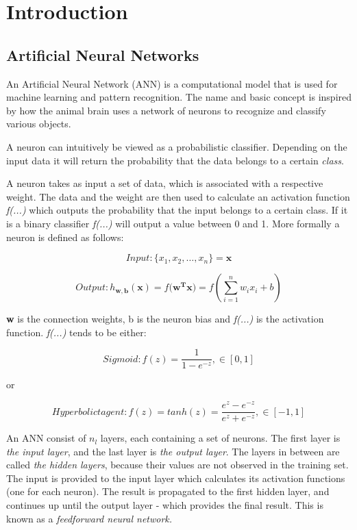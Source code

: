\chapter{Introduction}

\section{Artificial Neural Networks}

An Artificial Neural Network (ANN) is a computational model that is used for machine learning and pattern recognition. The name and basic concept is inspired by how the animal brain uses a network of neurons to recognize and classify various objects. 

A neuron can intuitively be viewed as a probabilistic classifier. Depending on the input data it will return the probability that the data belongs to a certain \textit{class}. 

A neuron takes as input a set of data, which is associated with a respective weight. The data and the weight are then used to calculate an activation function \textit{f(...)} which outputs the probability that the input belongs to a certain class. If it is a binary classifier \textit{f(...)} will output a value between 0 and 1. More formally a neuron is defined as follows: 

\begin{equation*}
Input: \{x_1, x_2,\dots, x_n\} = \mathbf{x} 
\end{equation*}

\begin{equation*}
Output: h_{\mathbf{w, b}}(\mathbf{x}) = f(\mathbf{w^{T}x)} = f(\sum_{i=1}^{n}w_i x_i + b)
\end{equation*}

\textbf{w} is the connection weights, b is the neuron bias and \textit{f(...)} is the activation function. \textit{f(...)} tends to be either:

\begin{equation*}
Sigmoid: f(z) = \frac{1}{1 - e^{-z}}, \in [0,1]
\end{equation*}

or 

\begin{equation*}
Hyperbolic tagent: f(z) = tanh(z) = \frac{e^z - e^{-z}}{e^z + e^{-z}}, \in [-1,1]
\end{equation*}

An ANN consist of $ n_l $ layers, each containing a set of neurons. The first layer is \textit{the input layer}, and the last layer is \textit{the output layer}. The layers in between are called \textit{the hidden layers}, because their values are not observed in the training set. The input is provided to the input layer which calculates its activation functions (one for each neuron). The result is propagated to the first hidden layer, and continues up until the output layer - which provides the final result. This is known as a \textit{feedforward neural network.}


